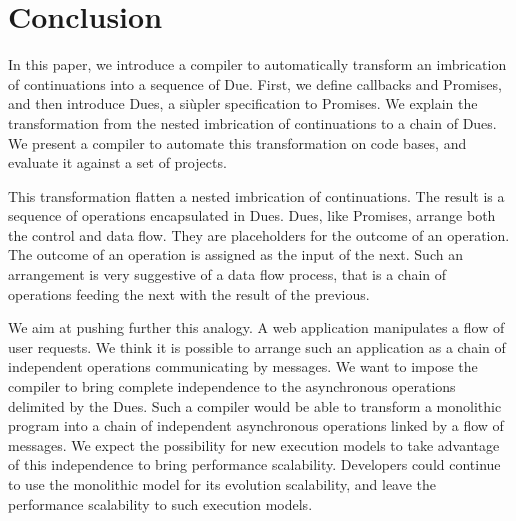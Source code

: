 \section{Conclusion} \label{section:conclusion}

In this paper, we introduce a compiler to automatically transform an imbrication of continuations into a sequence of Due.
First, we define callbacks and Promises, and then introduce Dues, a siùpler specification to Promises.
We explain the transformation from the nested imbrication of continuations to a chain of Dues.
We present a compiler to automate this transformation on code bases, and evaluate it against a set of projects.


This transformation flatten a nested imbrication of continuations.
The result is a sequence of operations encapsulated in Dues.
Dues, like Promises, arrange both the control and data flow.
They are placeholders for the outcome of an operation.
The outcome of an operation is assigned as the input of the next.
Such an arrangement is very suggestive of a data flow process, that is a chain of operations feeding the next with the result of the previous.

We aim at pushing further this analogy.
A web application manipulates a flow of user requests.
We think it is possible to arrange such an application as a chain of independent operations communicating by messages.
We want to impose the compiler to bring complete independence to the asynchronous operations delimited by the Dues.
Such a compiler would be able to transform a monolithic program into a chain of independent asynchronous operations linked by a flow of messages.
We expect the possibility for new execution models to take advantage of this independence to bring performance scalability.
Developers could continue to use the monolithic model for its evolution scalability, and leave the performance scalability to such execution models.
